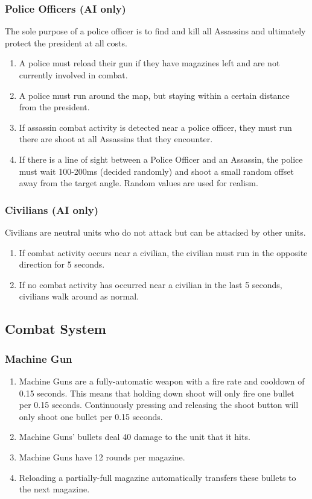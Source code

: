 \documentclass[12pt]{article}
\newenvironment{req} {\begin{enumerate}[leftmargin=2.5cm, label = \textbf{REQ \arabic{subsection}.\arabic{subsubsection}.\arabic*:}]} {\end{enumerate}}
\begin{document}
\subsubsection{Police Officers (AI only)}
The sole purpose of a police officer is to find and kill all Assassins and ultimately protect the president at all costs.
\begin{req}
	\item A police must reload their gun if they have magazines left and are not currently involved in combat.
	\item A police must run around the map, but staying within a certain distance from the president.
	\item If assassin combat activity is detected near a police officer, they must run there are shoot at all Assassins that they encounter.
	\item If there is a line of sight between a Police Officer and an Assassin, the police must wait 100-200ms (decided randomly) and shoot a small random offset away from the target angle. Random values are used for realism.
\end{req}

\subsubsection{Civilians (AI only)}
Civilians are neutral units who do not attack but can be attacked by other units.
\begin{req}
	\item If combat activity occurs near a civilian, the civilian must run in the opposite direction for 5 seconds.
	\item If no combat activity has occurred near a civilian in the last 5 seconds, civilians walk around as normal.
\end{req}

\subsection{Combat System}
\subsubsection{Machine Gun}
\begin{req}
	\item Machine Guns are a fully-automatic weapon with a fire rate and cooldown of 0.15 seconds. This means that holding down shoot will only fire one bullet per 0.15 seconds. Continuously pressing and releasing the shoot button will only shoot one bullet per 0.15 seconds.
	\item Machine Guns' bullets deal 40 damage to the unit that it hits.
	\item Machine Guns have 12 rounds per magazine. 
	\item Reloading a partially-full magazine automatically transfers these bullets to the next magazine.
\end{req}
\end{document}
